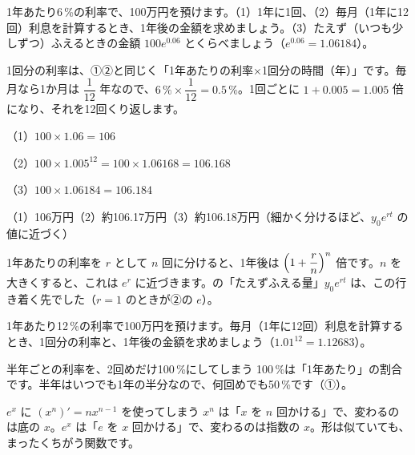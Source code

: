 \begin{reidai}
1年あたり6\,\%の利率で、100万円を預けます。（1）1年に1回、（2）毎月（1年に12回）利息を計算するとき、1年後の金額を求めましょう。（3）たえず（いつも少しずつ）ふえるときの金額 $100e^{0.06}$ とくらべましょう（$e^{0.06}=1.06184$）。\par
\kangaekata 1回分の利率は、①②と同じく「1年あたりの利率×1回分の時間（年）」です。毎月なら1か月は $\dfrac{1}{12}$ 年なので、$6\,\%\times\dfrac{1}{12}=0.5\,\%$。1回ごとに $1+0.005=1.005$ 倍になり、それを12回くり返します。\par
\shiki（1）$100\times1.06=106$\par
\hspace*{2.6\zw}（2）$100\times1.005^{12}=100\times1.06168=106.168$\par
\hspace*{2.6\zw}（3）$100\times1.06184=106.184$\par
\kotae （1）106万円\quad（2）約106.17万円\quad（3）約106.18万円（細かく分けるほど、$y_0e^{rt}$ の値に近づく）
\end{reidai}

\noindent 1年あたりの利率を $r$ として $n$ 回に分けると、1年後は $\Bigl(1+\dfrac{r}{n}\Bigr)^n$ 倍です。$n$ を大きくすると、これは $e^r$ に近づきます。の「たえずふえる量」$y_0e^{rt}$ は、この行き着く先でした（$r=1$ のときが②の $e$）。

\begin{jibun}
1年あたり12\,\%の利率で100万円を預けます。毎月（1年に12回）利息を計算するとき、1回分の利率と、1年後の金額を求めましょう（$1.01^{12}=1.12683$）。
\end{jibun}


\begin{tsumazuki}{半年ごとの利率を、2回めだけ100\,\%にしてしまう}
100\,\%は「1年あたり」の割合です。半年はいつでも1年の半分なので、何回めでも50\,\%です（①）。
\end{tsumazuki}

\begin{tsumazuki}{$e^x$ に $(x^n)'=nx^{n-1}$ を使ってしまう}
$x^n$ は「$x$ を $n$ 回かける」で、変わるのは底の $x$。$e^x$ は「$e$ を $x$ 回かける」で、変わるのは指数の $x$。形は似ていても、まったくちがう関数です。
\end{tsumazuki}

